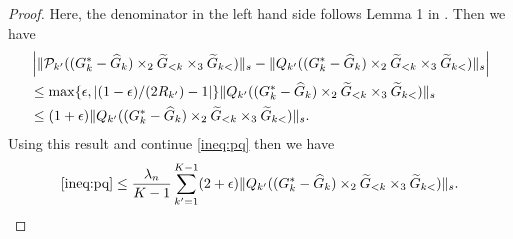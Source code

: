 \begin{proof}
Here, the denominator in the left hand side follows Lemma 1 in \cite{negahban2011estimation}.
Then we have
\begin{align*}
	 &\left| \|\mP_{k'}((G_k^* - \hat{G}_k) \times_2 \tilde{G}_{<k} \times_3 \tilde{G}_{k<})\|_{s} -  \|Q_{k'}((G_k^* - \hat{G}_k) \times_2 \tilde{G}_{<k} \times_3 \tilde{G}_{k<})\|_{s}  \right| \\
	 &\leq \max\{\epsilon,| (1-\epsilon)/(2R_{k'}) - 1| \}\|Q_{k'}((G_k^* - \hat{G}_k) \times_2 \tilde{G}_{<k} \times_3 \tilde{G}_{k<})\|_{s}\\
	 & \leq (1 + \epsilon) \|Q_{k'}((G_k^* - \hat{G}_k) \times_2 \tilde{G}_{<k} \times_3 \tilde{G}_{k<})\|_{s}.
\end{align*}
Using this result and continue \eqref{ineq:pq} then we have
\begin{align}
	\eqref{ineq:pq} \leq \frac{\lambda_n}{K-1}\sum_{k'=1}^{K-1} (2+\epsilon)\|Q_{k'}((G_k^* - \hat{G}_k) \times_2 \tilde{G}_{<k} \times_3 \tilde{G}_{k<})\|_{s}. \label{ineq:pq2}
\end{align}


\end{proof}
